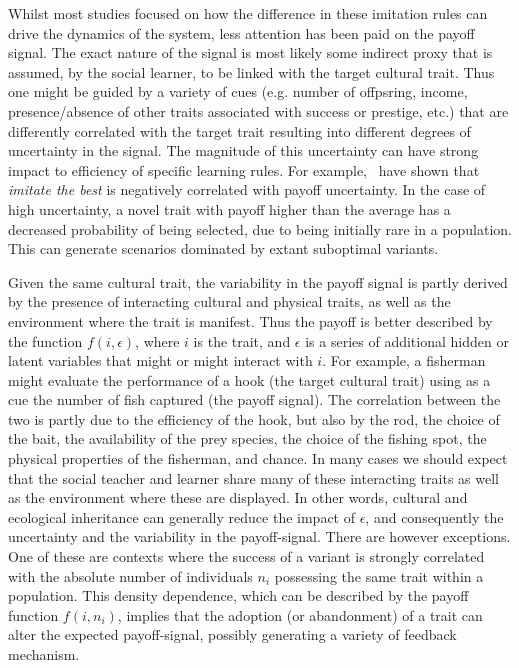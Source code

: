 \documentclass[preprint,authoryear]{elsarticle}
\begin{document}
Whilst most studies focused on how the difference in these imitation rules can drive the dynamics of the system, less attention has been paid on the payoff signal.  The exact nature of the signal is most likely some indirect proxy that is assumed, by the social learner, to be linked with the target cultural trait. Thus one might be guided by a variety of cues (e.g. number of offpsring, income, presence/absence of other traits associated with success or prestige, etc.) that are differently correlated with the target trait resulting into different degrees of uncertainty in the signal. The magnitude of this uncertainty can have strong impact to efficiency of specific learning rules. For example,~\citet{crema_lake_inpress} have shown that \emph{imitate the best} is negatively correlated with payoff uncertainty. In the case of high uncertainty, a novel trait with payoff higher than the average has a decreased probability of being selected, due to being initially rare in a population. This can generate scenarios dominated by extant suboptimal variants.

Given the same cultural trait, the variability in the payoff signal is partly derived by the presence of interacting cultural and physical traits, as well as the environment where the trait is manifest. Thus the payoff is better described by the function $f(i,\epsilon)$, where $i$ is the trait, and $\epsilon$ is a series of additional hidden or latent variables that might or might interact with $i$. For example, a fisherman might evaluate the performance of a hook (the target cultural trait) using as a cue the number of fish captured (the payoff signal). The correlation between the two is partly due to the efficiency of the hook, but also by the rod, the choice of the bait, the availability of the prey species, the choice of the fishing spot, the physical properties of the fisherman, and chance. In many cases we should expect that the social teacher and learner share many of these interacting traits as well as the environment where these are displayed. In other words, cultural and ecological inheritance can generally reduce the impact of $\epsilon$, and consequently the uncertainty and the variability in the payoff-signal. There are however exceptions. One of these are contexts where the success of a variant is strongly correlated with the absolute number of individuals $n_i$ possessing the same trait within a population. This density dependence, which can be described by the payoff function $f(i,n_i)$, implies that the adoption (or abandonment) of a trait can alter the expected payoff-signal, possibly generating a variety of feedback mechanism.  
\end{document}
